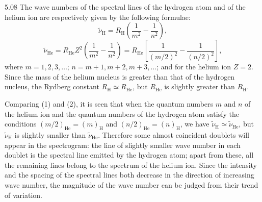 \begin{solution}{5.08}
The wave numbers of the spectral lines of the hydrogen atom and of the helium ion are
respectively given by the following formulae:
\begin{equation}
\tilde{\nu}_{\mathrm{H}} = R_{\mathrm{H}}\left(\frac{1}{m^2} - \frac{1}{n^2}\right), \tag{1}
\end{equation}
\begin{equation}
\tilde{\nu}_{\mathrm{He}} = R_{\mathrm{He}}Z^2\left(\frac{1}{m^2} - \frac{1}{n^2}\right)
= R_{\mathrm{He}}\left[\frac{1}{(m/2)^2} - \frac{1}{(n/2)^2}\right], \tag{2}
\end{equation}
where $m = 1, 2, 3, \ldots$; $n = m+1, m+2, m+3, \ldots$; and for the helium ion $Z = 2$.
Since the mass of the helium nucleus is greater than that of the hydrogen nucleus, the
Rydberg constant $R_{\mathrm{H}} \simeq R_{\mathrm{He}}$, but $R_{\mathrm{He}}$ is slightly
greater than $R_{\mathrm{H}}$.

Comparing (1) and (2), it is seen that when the quantum numbers $m$ and $n$ of the helium ion
and the quantum numbers of the hydrogen atom satisfy the conditions $(m/2)_{\mathrm{He}} =
(m)_{\mathrm{H}}$ and $(n/2)_{\mathrm{He}} = (n)_{\mathrm{H}}$, we have
$\tilde{\nu}_{\mathrm{H}} \simeq \tilde{\nu}_{\mathrm{He}}$, but
$\tilde{\nu}_{\mathrm{H}}$ is slightly smaller than $\tilde{\nu}_{\mathrm{He}}$. Therefore
some almost coincident doublets will appear in the spectrogram: the line of slightly smaller
wave number in each doublet is the spectral line emitted by the hydrogen atom; apart from
these, all the remaining lines belong to the spectrum of the helium ion. Since the intensity
and the spacing of the spectral lines both decrease in the direction of increasing wave
number, the magnitude of the wave number can be judged from their trend of variation.


\end{solution}
